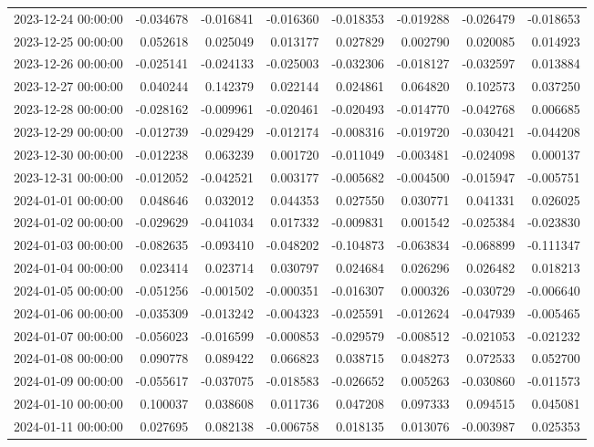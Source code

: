 \begin{tabular}{lrrrrrrr}
2023-12-24 00:00:00 & -0.034678 & -0.016841 & -0.016360 & -0.018353 & -0.019288 & -0.026479 & -0.018653 \\
2023-12-25 00:00:00 & 0.052618 & 0.025049 & 0.013177 & 0.027829 & 0.002790 & 0.020085 & 0.014923 \\
2023-12-26 00:00:00 & -0.025141 & -0.024133 & -0.025003 & -0.032306 & -0.018127 & -0.032597 & 0.013884 \\
2023-12-27 00:00:00 & 0.040244 & 0.142379 & 0.022144 & 0.024861 & 0.064820 & 0.102573 & 0.037250 \\
2023-12-28 00:00:00 & -0.028162 & -0.009961 & -0.020461 & -0.020493 & -0.014770 & -0.042768 & 0.006685 \\
2023-12-29 00:00:00 & -0.012739 & -0.029429 & -0.012174 & -0.008316 & -0.019720 & -0.030421 & -0.044208 \\
2023-12-30 00:00:00 & -0.012238 & 0.063239 & 0.001720 & -0.011049 & -0.003481 & -0.024098 & 0.000137 \\
2023-12-31 00:00:00 & -0.012052 & -0.042521 & 0.003177 & -0.005682 & -0.004500 & -0.015947 & -0.005751 \\
2024-01-01 00:00:00 & 0.048646 & 0.032012 & 0.044353 & 0.027550 & 0.030771 & 0.041331 & 0.026025 \\
2024-01-02 00:00:00 & -0.029629 & -0.041034 & 0.017332 & -0.009831 & 0.001542 & -0.025384 & -0.023830 \\
2024-01-03 00:00:00 & -0.082635 & -0.093410 & -0.048202 & -0.104873 & -0.063834 & -0.068899 & -0.111347 \\
2024-01-04 00:00:00 & 0.023414 & 0.023714 & 0.030797 & 0.024684 & 0.026296 & 0.026482 & 0.018213 \\
2024-01-05 00:00:00 & -0.051256 & -0.001502 & -0.000351 & -0.016307 & 0.000326 & -0.030729 & -0.006640 \\
2024-01-06 00:00:00 & -0.035309 & -0.013242 & -0.004323 & -0.025591 & -0.012624 & -0.047939 & -0.005465 \\
2024-01-07 00:00:00 & -0.056023 & -0.016599 & -0.000853 & -0.029579 & -0.008512 & -0.021053 & -0.021232 \\
2024-01-08 00:00:00 & 0.090778 & 0.089422 & 0.066823 & 0.038715 & 0.048273 & 0.072533 & 0.052700 \\
2024-01-09 00:00:00 & -0.055617 & -0.037075 & -0.018583 & -0.026652 & 0.005263 & -0.030860 & -0.011573 \\
2024-01-10 00:00:00 & 0.100037 & 0.038608 & 0.011736 & 0.047208 & 0.097333 & 0.094515 & 0.045081 \\
2024-01-11 00:00:00 & 0.027695 & 0.082138 & -0.006758 & 0.018135 & 0.013076 & -0.003987 & 0.025353 \\

\end{tabular}

